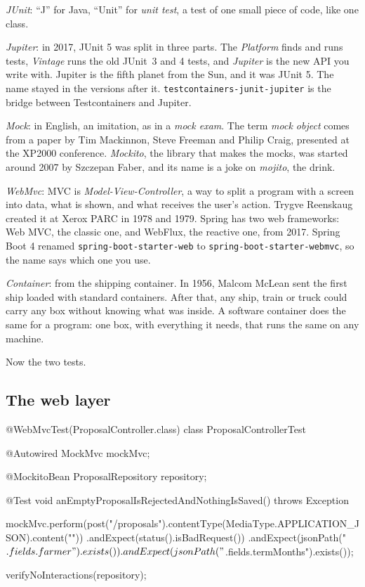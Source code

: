 \begin{etymology}
\emph{JUnit}: ``J'' for Java, ``Unit'' for \emph{unit test}, a test of one
small piece of code, like one class.

\emph{Jupiter}: in 2017, JUnit 5 was split in three parts. The
\emph{Platform} finds and runs tests, \emph{Vintage} runs the old JUnit~3 and
4 tests, and \emph{Jupiter} is the new API you write with. Jupiter is the
fifth planet from the Sun, and it was JUnit 5. The name stayed in the
versions after it. \texttt{testcontainers-junit-jupiter} is the bridge between
Testcontainers and Jupiter.

\emph{Mock}: in English, an imitation, as in a \emph{mock exam}. The term
\emph{mock object} comes from a paper by Tim Mackinnon, Steve Freeman and
Philip Craig, presented at the XP2000 conference. \emph{Mockito}, the library
that makes the mocks, was started around 2007 by Szczepan Faber, and its
name is a joke on \emph{mojito}, the drink.

\emph{WebMvc}: MVC is \emph{Model-View-Controller}, a way to split a program
with a screen into data, what is shown, and what receives the user's action.
Trygve Reenskaug created it at Xerox PARC in 1978 and 1979. Spring has two
web frameworks: Web MVC, the classic one, and WebFlux, the reactive one, from
2017. Spring Boot 4 renamed \texttt{spring-boot-starter-web} to
\texttt{spring-boot-starter-webmvc}, so the name says which one you use.

\emph{Container}: from the shipping container. In 1956, Malcom McLean sent
the first ship loaded with standard containers. After that, any ship, train
or truck could carry any box without knowing what was inside. A software
container does the same for a program: one box, with everything it needs,
that runs the same on any machine.
\end{etymology}

Now the two tests.

\subsection*{The web layer}

\begin{code}
@WebMvcTest(ProposalController.class)
class ProposalControllerTest {

    @Autowired
    MockMvc mockMvc;

    @MockitoBean
    ProposalRepository repository;

    @Test
    void anEmptyProposalIsRejectedAndNothingIsSaved() throws Exception {
        mockMvc.perform(post("/proposals").contentType(MediaType.APPLICATION_JSON).content("{}"))
                .andExpect(status().isBadRequest())
                .andExpect(jsonPath("$.fields.farmer").exists())
                .andExpect(jsonPath("$.fields.termMonths").exists());

        verifyNoInteractions(repository);
    }
}
\end{code}

